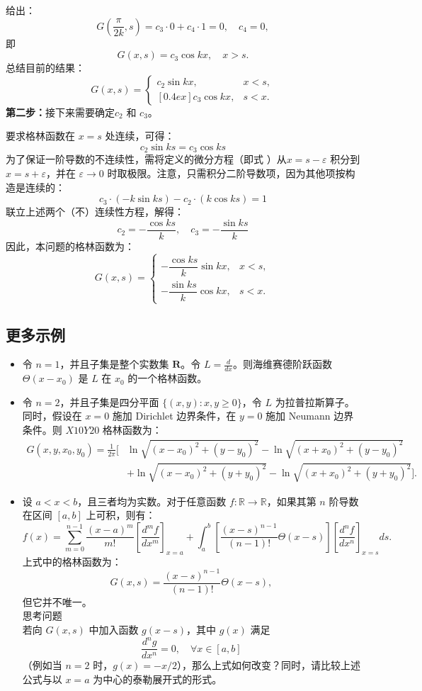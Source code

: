 给出：
$$
G\left(\frac{\pi}{2k},s\right) = c_3 \cdot 0 + c_4 \cdot 1 = 0,
\quad c_4 = 0,~
$$
即
$$
G(x,s) = c_3 \cos kx, \quad x > s.~
$$
总结目前的结果：
$$
G(x,s) = 
\begin{cases}
c_2 \sin kx, & x < s, \\
[0.4ex]
c_3 \cos kx, & s < x.
\end{cases}~
$$
\textbf{第二步：}接下来需要确定$c_{2}$ 和 $c_{3}$。

要求格林函数在 $x = s$ 处连续，可得：
$$
c_{2} \sin ks = c_{3} \cos ks~
$$
为了保证一阶导数的不连续性，需将定义的微分方程（即式 \*）从$x = s - \varepsilon$ 积分到 $x = s + \varepsilon$，并在 $\varepsilon \to 0$ 时取极限。注意，只需积分二阶导数项，因为其他项按构造是连续的：
$$
c_{3} \cdot (-k \sin ks) - c_{2} \cdot (k \cos ks) = 1~
$$
联立上述两个（不）连续性方程，解得：
$$
c_{2} = -\frac{\cos ks}{k}, 
\quad 
c_{3} = -\frac{\sin ks}{k}~
$$
因此，本问题的格林函数为：
$$
G(x,s) = 
\begin{cases}
-\dfrac{\cos ks}{k} \sin kx, & x < s, \\
-\dfrac{\sin ks}{k} \cos kx, & s < x.
\end{cases}~
$$
\subsection{更多示例}
\begin{itemize}
\item 令 $n = 1$，并且子集是整个实数集 $\mathbf{R}$。令 $L = \frac{d}{dx}$。则海维赛德阶跃函数 $\Theta(x - x_{0})$ 是 $L$ 在 $x_{0}$ 的一个格林函数。
\item 令 $n = 2$，并且子集是四分平面 $\{(x, y) : x, y \geq 0\}$，令 $L$ 为拉普拉斯算子。同时，假设在 $x = 0$ 施加 Dirichlet 边界条件，在 $y = 0$ 施加 Neumann 边界条件。则 $X10Y20$ 格林函数为：
$$
\begin{aligned}
G(x,y,x_{0},y_{0}) = \frac{1}{2\pi} \Big[
&\ln \sqrt{(x-x_{0})^{2} + (y-y_{0})^{2}}
- \ln \sqrt{(x+x_{0})^{2} + (y-y_{0})^{2}} \\
&+ \ln \sqrt{(x-x_{0})^{2} + (y+y_{0})^{2}}
- \ln \sqrt{(x+x_{0})^{2} + (y+y_{0})^{2}}
\Big].
\end{aligned}~
$$
\item 设 $a < x < b$，且三者均为实数。对于任意函数
   $f: \mathbb{R} \to \mathbb{R}$，如果其第 $n$ 阶导数在区间 $[a,b]$ 上可积，则有：
$$
f(x) = \sum_{m=0}^{n-1} \frac{(x-a)^{m}}{m!}
\left[ \frac{d^{m} f}{dx^{m}} \right]_{x=a}
+ \int_{a}^{b}
\left[
\frac{(x-s)^{n-1}}{(n-1)!} \Theta(x-s)
\right]
\left[ \frac{d^{n} f}{dx^{n}} \right]_{x=s} ds.~
$$
上式中的格林函数为：
$$
G(x,s) = \frac{(x-s)^{n-1}}{(n-1)!} \Theta(x-s),~
$$
但它并不唯一。\\
思考问题\\
若向 $G(x,s)$ 中加入函数 $g(x-s)$，其中
$g(x)$ 满足
$$
\frac{d^{n} g}{dx^{n}} = 0,
\quad \forall x \in [a,b]~
$$
（例如当 $n=2$ 时，$g(x) = -x/2$），那么上式如何改变？同时，请比较上述公式与以 $x = a$ 为中心的泰勒展开式的形式。
\end{itemize}
